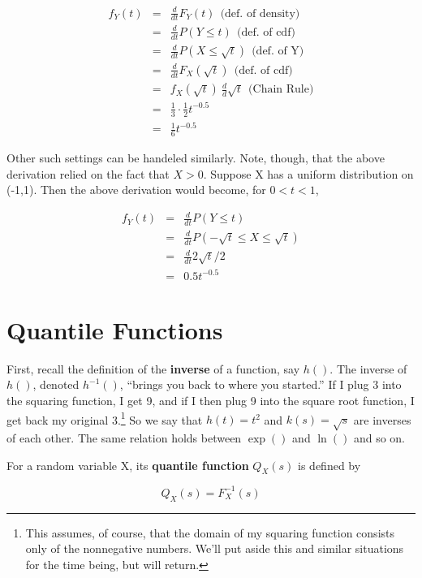 \begin{eqnarray}
f_Y(t) &=& \frac{d}{dt} F_Y(t) ~~ \textrm{(def. of density)}\\ 
&=& \frac{d}{dt} P(Y \leq t) ~~ \textrm{(def. of cdf)} \\
&=& \frac{d}{dt} P(X \leq \sqrt{t}) ~~ \textrm{(def. of Y)} \\
&=& \frac{d}{dt} F_X(\sqrt{t}) ~~ \textrm{(def. of cdf)} \\
&=& f_X(\sqrt{t}) ~ \frac{d}{d} \sqrt{t} ~~ \textrm{(Chain Rule)} \\
&=& \frac{1}{3} \cdot \frac{1}{2} t^{-0.5} \\
&=& \frac{1}{6} t^{-0.5}
\end{eqnarray}

Other such settings can be handeled similarly.  Note, though, that the
above derivation relied on the fact that $X > 0$.  Suppose X has a
uniform distribution on (-1,1).  Then the above derivation would become,
for $0 < t < 1$,

\begin{eqnarray}
f_Y(t) &=& \frac{d}{dt} P(Y \leq t) \\
&=& \frac{d}{dt} P(-\sqrt{t} \leq X \leq \sqrt{t}) \\
&=& \frac{d}{dt} 2 \sqrt{t} / 2 \\
&=& 0.5 t^{-0.5}
\end{eqnarray}

\section{Quantile Functions}

First, recall the definition of the {\bf inverse} of a function, say
$h()$.  The inverse of $h()$, denoted $h^{-1}()$, ``brings you back to
where you started.'' If I plug 3 into the squaring function, I get 9,
and if I then plug 9 into the square root function, I get back my
original 3.\footnote{This assumes, of course, that the domain of my
squaring function consists only of the nonnegative numbers.  We'll put
aside this and similar situations for the time being, but will return.}
So we say that $h(t) = t^2$ and $k(s) = \sqrt{s}$ are inverses of each
other.  The same relation holds between $\exp()$ and $\ln()$ and so on.

For a random variable X, its {\bf quantile function} $Q_X(s)$ is defined
by

\begin{equation}
Q_X(s) = F_X^{-1}(s)
\end{equation}

